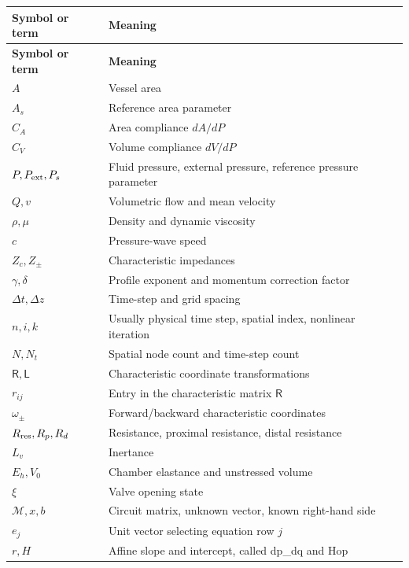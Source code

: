 \documentclass[11pt,a4paper]{article}
\begin{document}
\begingroup\footnotesize
\setlength{\tabcolsep}{4pt}
\begin{longtable}{>{\raggedright\arraybackslash}p{}>{\raggedright\arraybackslash}p{}}
\toprule
\textbf{Symbol or term} & \textbf{Meaning} \\
\midrule
\endfirsthead
\textbf{Symbol or term} & \textbf{Meaning} \\
\midrule
\endhead
\bottomrule
\endfoot
\(A\) & Vessel area \\
\(A_s\) & Reference area parameter \\
\(C_A\) & Area compliance \(dA/dP\) \\
\(C_V\) & Volume compliance \(dV/dP\) \\
\(P,P_{\rm ext},P_s\) & Fluid pressure, external pressure, reference pressure parameter \\
\(Q,v\) & Volumetric flow and mean velocity \\
\(\rho,\mu\) & Density and dynamic viscosity \\
\(c\) & Pressure-wave speed \\
\(Z_c,Z_\pm\) & Characteristic impedances \\
\(\gamma,\delta\) & Profile exponent and momentum correction factor \\
\(\Delta t,\Delta z\) & Time-step and grid spacing \\
\(n,i,k\) & Usually physical time step, spatial index, nonlinear iteration \\
\(N,N_t\) & Spatial node count and time-step count \\
\(\mathsf R,\mathsf L\) & Characteristic coordinate transformations \\
\(r_{ij}\) & Entry in the characteristic matrix \(\mathsf R\) \\
\(\omega_\pm\) & Forward/backward characteristic coordinates \\
\(R_{\rm res},R_p,R_d\) & Resistance, proximal resistance, distal resistance \\
\(L_v\) & Inertance \\
\(E_h,V_0\) & Chamber elastance and unstressed volume \\
\(\xi\) & Valve opening state \\
\(\mathcal M,x,b\) & Circuit matrix, unknown vector, known right-hand side \\
\(e_j\) & Unit vector selecting equation row \(j\) \\
\(r,H\) & Affine slope and intercept, called dp\_dq and Hop \\

\end{longtable}
\end{document}
